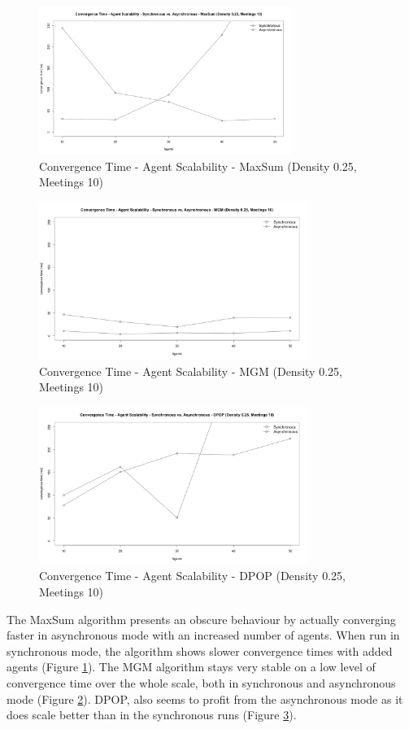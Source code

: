 \begin{figure}[H]
\centering
\includegraphics[width=310px]{graphics/experiments/static/st_14}
\caption{Convergence Time - Agent Scalability - MaxSum (Density 0.25, Meetings 10)}
\label{fig:st_14}
\end{figure}

\begin{figure}[H]
\centering
\includegraphics[width=330px]{graphics/experiments/static/st_15}
\caption{Convergence Time - Agent Scalability - MGM (Density 0.25, Meetings 10)}
\label{fig:st_15}
\end{figure}
\begin{figure}[H]
\centering
\includegraphics[width=330px]{graphics/experiments/static/st_16}
\caption{Convergence Time - Agent Scalability - DPOP (Density 0.25, Meetings 10)}
\label{fig:st_16}
\end{figure}
The MaxSum algorithm presents an obscure behaviour by actually converging faster in asynchronous mode with an increased number of agents. When run in synchronous mode, the algorithm shows slower convergence times with added agents (Figure \ref{fig:st_14}). The MGM algorithm stays very stable on a low level of convergence time over the whole scale, both in synchronous and asynchronous mode (Figure \ref{fig:st_15}). DPOP, also seems to profit from the asynchronous mode as it does scale better than in the synchronous  runs (Figure \ref{fig:st_16}).
